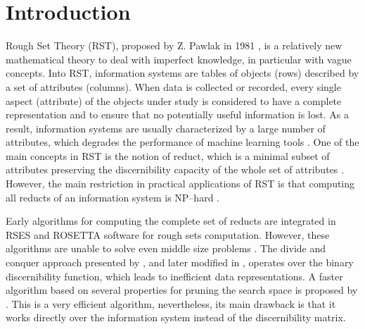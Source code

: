 \documentclass[authoryear,preprint,review,12pt]{elsarticle}
\begin{document}
\section{Introduction}
  Rough Set Theory (RST), proposed by Z. Pawlak in 1981 \citep{Pawlak81,Pawlak81-2,Pawlak82,Pawlak91}, 
  is a relatively new mathematical theory to deal with imperfect knowledge, in particular with vague 
  concepts. Into RST, information systems are tables of objects (rows) described by a set of attributes (columns). 
  When data is collected or recorded, every single aspect (attribute) of the objects under study is considered 
  to have a complete representation and to ensure that no potentially useful information is lost.
  As a result, information systems are usually characterized by a large number of attributes,
  which degrades the performance of machine learning tools \citep{Parthalain08}.
  One of the main concepts in RST is the notion of reduct, which is a minimal subset of attributes 
  preserving the discernibility capacity of the whole set of attributes \citep{Pawlak91}.  
  However, the main restriction in practical applications of RST is that computing all reducts of an 
  information system is NP--hard \citep{Skowron92}. 
  
  Early algorithms for computing the complete set of reducts \citep{Bazan2001,Ohrn00} are integrated in RSES and ROSETTA software for rough sets computation. However, these algorithms are unable to solve even middle size problems \citep{Lazo15}. The divide and conquer approach presented by \cite{Starzyk99,Starzyk00}, and later modified in \citep{Jensen14}, operates over the binary discernibility function, which leads to inefficient data representations. A faster algorithm based on several properties for pruning the search space is proposed by \cite{WangP07}. This is a very efficient algorithm, nevertheless, its main drawback is that it works directly over the information system instead of the discernibility matrix.   
     	
\end{document}
